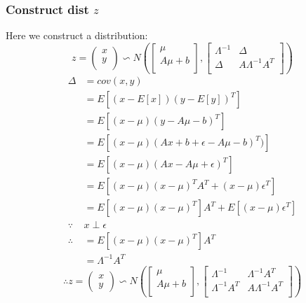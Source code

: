 \documentclass{report}
\begin{document}
\subsubsection{Construct dist $z$}
Here we construct a distribution:
$$
z = 
\left (
\begin{matrix}
x\\
y\\
\end{matrix}
\right )
\backsim N(
\left [
\begin{matrix}
\mu\\
A\mu+b\\
\end{matrix}
\right ],
\left [
\begin{matrix}
\Lambda^{-1}&\Delta\\
\Delta&A\Lambda^{-1} A^T\\
\end{matrix}
\right ]
)
$$
$$
\begin{aligned}
\Delta
&=cov(x,y)\\
&=E[(x-E[x])(y-E[y])^T]\\
&=E[(x-\mu)(y-A\mu - b)^T]\\
&=E[(x-\mu)(Ax+b+ \epsilon -A\mu -b)^T)]\\
&=E[(x-\mu)(Ax-A\mu + \epsilon)^T]\\
&=E[(x-\mu)(x-\mu)^T A^T + (x-\mu)\epsilon^T]\\
&=E[(x-\mu)(x-\mu)^T]A^T + E[(x-\mu)\epsilon^T] \\
\because &x \perp \epsilon\\
\therefore &=E[(x-\mu)(x-\mu)^T]A^T\\
&=\Lambda^{-1}A^T
\end{aligned}
$$
$$
\therefore z=
\left ( \begin{matrix}
x\\y
\end{matrix} \right )
\backsim N(
\left [
\begin{matrix}
\mu\\
A\mu+b\\
\end{matrix}
\right ],
\left [
\begin{matrix}
\Lambda^{-1}&\Lambda^{-1}A^T\\
\Lambda^{-1}A^T&A\Lambda^{-1} A^T\\
\end{matrix}
\right ]
)
$$
\end{document}
